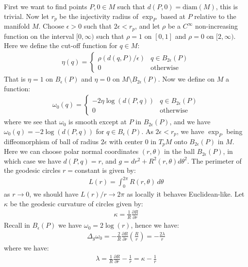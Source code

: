 \documentclass[11pt]{book}
\theoremstyle{break}
\theoremstyle{break}
\newcommand{\pd}{\partial}
\begin{document}
First we want to find points $P, 0 \in M$ such that $d(P,0) = \text{diam}(M)$, this is trivial. Now let $r_p$ be the injectivity radius of $\exp_P$ based at $P$ relative to the manifold $M$. Choose $\epsilon>0$ such that $2\epsilon < r_p$, and let $\rho $ be a $C^\infty$ non-increasing function on the interval $[0,\infty)$ such that $\rho = 1$ on $[0,1]$ and $\rho = 0$ on $[2,\infty)$. Here we define the cut-off function for $q \in M$:
\begin{align*}
 \eta(q) = \begin{cases}
 \rho(d(q,P)/\epsilon) & q \in B_{2\epsilon}(P)\\
 0 & \text{otherwise}
 \end{cases}
\end{align*} 
That is $\eta = 1$ on $B_{\epsilon}(P)$ and $\eta = 0$ on $M\setminus B_{2\epsilon}(P)$. Now we define on $M$ a function:
\begin{align*}
\omega_0(q) = \begin{cases}
-2\eta\log(d(P,q)) & q \in B_{2\epsilon}(P)\\
0 & \text{otherwise} 
\end{cases}
\end{align*}
where we see that $\omega_0$ is smooth except at $P$ in $B_{2\epsilon}(P)$, and we have $\omega_0(q) = -2 \log(d(P,q))$ for $q \in B_\epsilon(P)$. As $2\epsilon < r_p $, we have $\exp_P$ being diffeomorphism of ball of radius $2\epsilon$ with center $0$ in $T_pM$ onto $B_{2\epsilon}(P)$ in $M$. Here we can choose polar normal coordinates $(r,\theta)$ in the ball $B_{2\epsilon}(P)$, in which case we have $d(P,q) = r$, and $g = dr^2 + R^2(r,\theta)d\theta^2$. The perimeter of the geodesic circles $r = $constant is given by:
\begin{align*}
L(r) = \int_0^{2\pi}R(r,\theta) \, d\theta 
\end{align*}
as $r \to 0$, we should have $L(r) / r \to 2\pi$ as locally it behaves Euclidean-like. Let $\kappa$ be the geodesic curvature of circles given by:
\begin{align*}
\kappa = \frac{1}{R}\frac{\pd R}{\pd r}
\end{align*} 
Recall in $B_\epsilon(P)$ we have $\omega_0 = 2\log(r)$, hence we have:
\begin{align*}
\Delta_g \omega_0 = -\frac{2}{R}\frac{\pd R}{\pd r}\left( \frac{R}{r}\right) = -\frac{2\lambda}{r}
\end{align*}
where we have:
\begin{align*}
\lambda = \frac{1}{R}\frac{\pd R}{\pd r} - \frac{1}{r} = \kappa - \frac{1}{r}
\end{align*}
\end{document}
